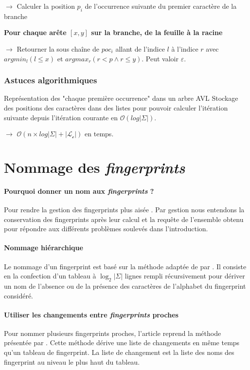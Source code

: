 \documentclass[a4paper]{article}
\begin{document}
$\rightarrow$ Calculer la position $p_i$ de l'occurrence suivante du premier caractère de la branche

\textbf{Pour chaque arête $[x,y]$ sur la branche, de la feuille à la racine}

$\rightarrow$ Retourner la sous chaîne de $poc_i$ allant de l'indice $l$ à l'indice $r$ avec $argmin_l(l \leq x)$ et $argmax_r(r < p \land r \leq y)$. Peut valoir $\varepsilon$.

\subsubsection{Astuces algorithmiques}

Représentation des "chaque première occurrence" dans un arbre AVL
Stockage des positions des caractères dans des listes pour pouvoir calculer l'itération suivante depuis l'itération courante en $\mathcal{O}(log |\Sigma|)$. \newline

$\rightarrow$ $\mathcal{O}(n \times log |\Sigma| + |\mathcal{L}_\mathcal{c}|)$ en temps.

\section{Nommage des \emph{fingerprints}}

\paragraph{Pourquoi donner un nom aux \emph{fingerprints} ?} Pour
rendre la gestion des fingerprints plus aisée \cite{amir}. Par
gestion nous entendons la conservation des fingerprints après leur
calcul et la requête de l'ensemble obtenu pour répondre aux différents
problèmes soulevés dans l'introduction.

\paragraph{Nommage hiérarchique} Le nommage d'un fingerprint est basé
sur la méthode adaptée de \cite{karp} par \cite{amir}. Il consiste en
la confection d'un tableau à $\log_2 |\Sigma|$ lignes rempli
récursivement pour dériver un nom de l'absence ou de la présence des
caractères de l'alphabet du fingerprint considéré.

\paragraph{Utiliser les changements entre \emph{fingerprints} proches}
Pour nommer plusieurs fingerprints proches, l'article reprend la
méthode présentée par \cite{tsur}. Cette méthode dérive une liste de
changements en même temps qu'un tableau de fingerprint. La liste de
changement est la liste des noms des fingerprint au niveau le plus
haut du tableau.
\end{document}
